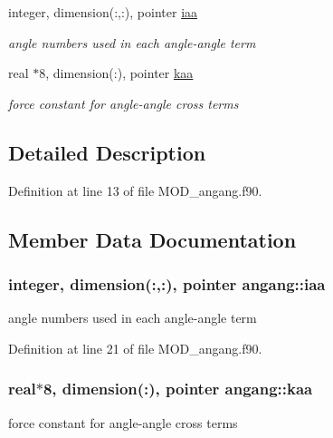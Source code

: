 \begin{DoxyCompactItemize}
integer, dimension(\-:,\-:), pointer \hyperlink{classangang_aaf8e4b6168f6109f78d0ef6ff11fe002}{iaa}
\begin{DoxyCompactList}\small\item\em angle numbers used in each angle-\/angle term \end{DoxyCompactList}\item 
real $\ast$8, dimension(\-:), pointer \hyperlink{classangang_a1aa50d6cb5b82c604b715118f90ab9ee}{kaa}
\begin{DoxyCompactList}\small\item\em force constant for angle-\/angle cross terms \end{DoxyCompactList}\end{DoxyCompactItemize}


\subsection{Detailed Description}


Definition at line 13 of file M\-O\-D\-\_\-angang.\-f90.



\subsection{Member Data Documentation}
\hypertarget{classangang_aaf8e4b6168f6109f78d0ef6ff11fe002}{
\subsubsection[{iaa}]{\setlength{\rightskip}{0pt plus 5cm}integer, dimension(\-:,\-:), pointer angang\-::iaa}}\label{classangang_aaf8e4b6168f6109f78d0ef6ff11fe002}


angle numbers used in each angle-\/angle term 



Definition at line 21 of file M\-O\-D\-\_\-angang.\-f90.

\hypertarget{classangang_a1aa50d6cb5b82c604b715118f90ab9ee}{
\subsubsection[{kaa}]{\setlength{\rightskip}{0pt plus 5cm}real$\ast$8, dimension(\-:), pointer angang\-::kaa}}\label{classangang_a1aa50d6cb5b82c604b715118f90ab9ee}


force constant for angle-\/angle cross terms 



